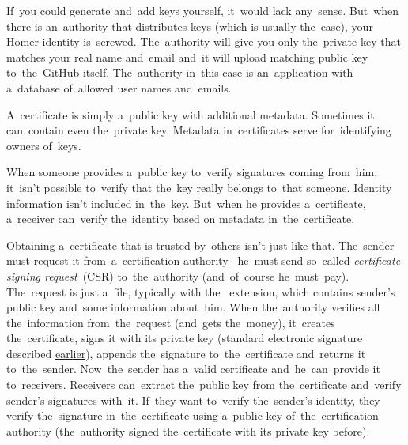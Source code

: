 If~you could generate and~add keys yourself, it~would lack any~sense.
But~when there is an~authority that distributes keys (which is usually the~case), your Homer identity is~screwed.
The~authority will give you only the~private key that matches your real name and~email and~it will upload matching public key to~the~GitHub itself.
The~authority in~this case is an~application with a~database of~allowed user names and~emails.

\label{certificate}
A~certificate is simply a~public key with additional metadata.
Sometimes it can~contain even the~private key.
Metadata in~certificates serve for~identifying owners of~keys.

When someone provides a~public key to~verify signatures coming from~him, it~isn't possible to~verify that the~key really belongs to~that someone.
Identity information isn't included in~the~key.
But~when he provides a~certificate, a~receiver can~verify the~identity based on metadata in~the~certificate.

Obtaining a~certificate that is trusted by~others isn't just like that.
The~sender must request it from~a~\hyperref[certificationauthority]{certification authority}\,--\,he~must send so~called \textit{certificate signing request}~(CSR) to~the~authority (and~of~course he~must~pay).
The~request is just a~file, typically with the~ extension, which contains sender's public key and~some information about~him.
When the~authority verifies all the~information from~the~request (and~gets the~money), it~creates the~certificate, signs it with its private key (standard electronic signature described \hyperref[electronicsignature]{earlier}), appends the~signature to~the~certificate and~returns it to~the~sender.
Now~the~sender has a~valid certificate and~he~can~provide it to~receivers.
Receivers can~extract the~public key from the~certificate and~verify sender's signatures with~it.
If~they want to~verify the~sender's identity, they verify the~signature in~the~certificate using a~public key of~the~certification authority (the~authority signed the~certificate with its private key before).


